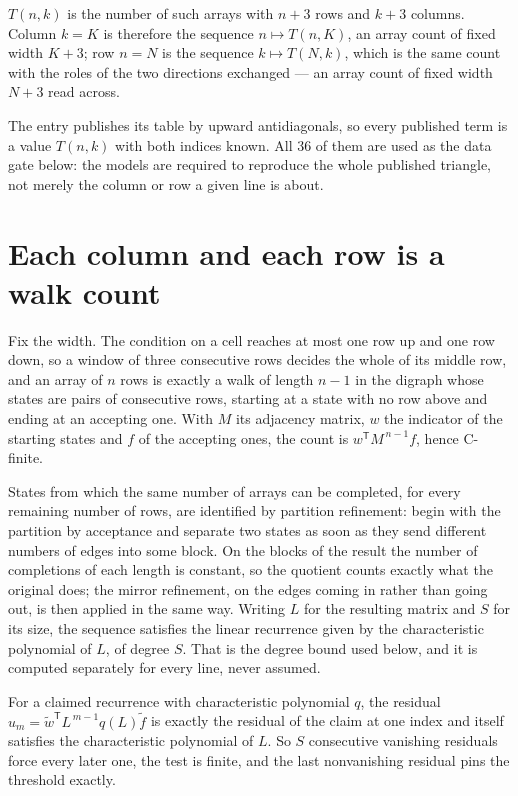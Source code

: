 \documentclass[11pt]{article}
\theoremstyle{definition}
\begin{document}
$T(n,k)$ is the number of such arrays with $n + 3$ rows and $k + 3$ columns. Column $k = K$ is therefore the sequence $n \mapsto T(n,K)$, an array count of fixed width $K + 3$; row $n = N$ is the sequence $k \mapsto T(N,k)$, which is the same count with the roles of the two directions exchanged --- an array count of fixed width $N + 3$ read across.

The entry publishes its table by upward antidiagonals, so every published term is a value $T(n,k)$ with both indices known. All 36 of them are used as the data gate below: the models are required to reproduce the whole published triangle, not merely the column or row a given line is about.

\section{Each column and each row is a walk count}

Fix the width. The condition on a cell reaches at most one row up and one row down, so a window of three consecutive rows decides the whole of its middle row, and an array of $n$ rows is exactly a walk of length $n-1$ in the digraph whose states are pairs of consecutive rows, starting at a state with no row above and ending at an accepting one. With $M$ its adjacency matrix, $w$ the indicator of the starting states and $f$ of the accepting ones, the count is $w^{\mathsf T}M^{\,n-1}f$, hence C-finite.

States from which the same number of arrays can be completed, for every remaining number of rows, are identified by partition refinement: begin with the partition by acceptance and separate two states as soon as they send different numbers of edges into some block. On the blocks of the result the number of completions of each length is constant, so the quotient counts exactly what the original does; the mirror refinement, on the edges coming in rather than going out, is then applied in the same way. Writing $L$ for the resulting matrix and $S$ for its size, the sequence satisfies the linear recurrence given by the characteristic polynomial of $L$, of degree $S$. That is the degree bound used below, and it is computed separately for every line, never assumed.

For a claimed recurrence with characteristic polynomial $q$, the residual $u_m = \tilde w^{\mathsf T}L^{\,m-1}q(L)\tilde f$ is exactly the residual of the claim at one index and itself satisfies the characteristic polynomial of $L$. So $S$ consecutive vanishing residuals force every later one, the test is finite, and the last nonvanishing residual pins the threshold exactly.
\end{document}
